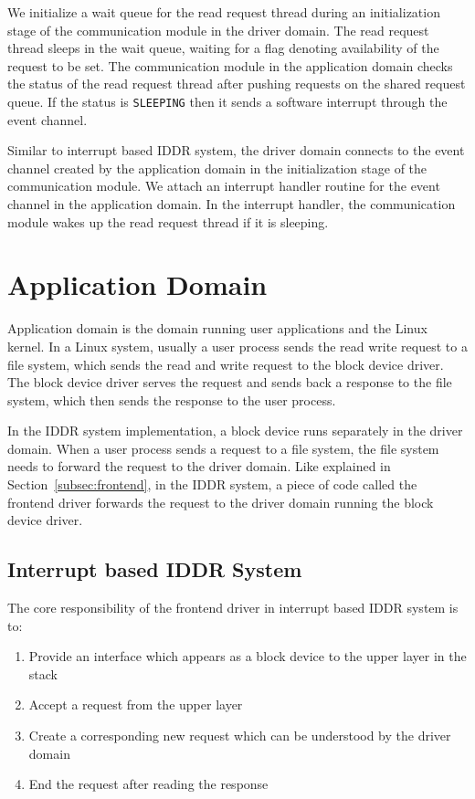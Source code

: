 \begin{itemize}
We initialize a wait queue for the read request thread during
an initialization stage of the communication module in the driver
domain. The read request thread sleeps in the wait queue, waiting for a
flag denoting availability of the request to be set. The communication
module in the application domain checks the status of the read request
thread after pushing requests on the shared request queue. If the status
is \texttt{SLEEPING} then it sends a software interrupt through the
event channel.

Similar to interrupt based IDDR system, the driver domain connects to the
event channel created by the application domain in the initialization
stage of the communication module. We attach an interrupt handler
routine for the event channel in the application domain. In the interrupt
handler, the communication module wakes up the read request thread if
it is sleeping.  
\end{itemize}

\section{Application Domain}

Application domain is the domain running user applications and the Linux
kernel. In a Linux system, usually a user process sends the read write
request to a file system, which sends the read and write request to
the block device driver. The block device driver serves the request and
sends back a response to the file system, which then sends the response
to the user process.

In the IDDR system implementation, a block device runs separately in
the driver domain. When a user process sends a request to a file system,
the file system needs to forward the request to the driver domain. Like
explained in Section~\ref{subsec:frontend}, in the IDDR system, a piece
of code called the frontend driver forwards the request to the driver
domain running the block device driver.

\subsection*{Interrupt based IDDR System}
The core responsibility of the frontend driver in interrupt based IDDR system is to:
\begin{enumerate}
\item Provide an interface which appears as a block device to the upper layer in the stack
\item Accept a request from the upper layer
\item Create a corresponding new request which can be understood by the driver domain
\item End the request after reading the response
\end{enumerate}

